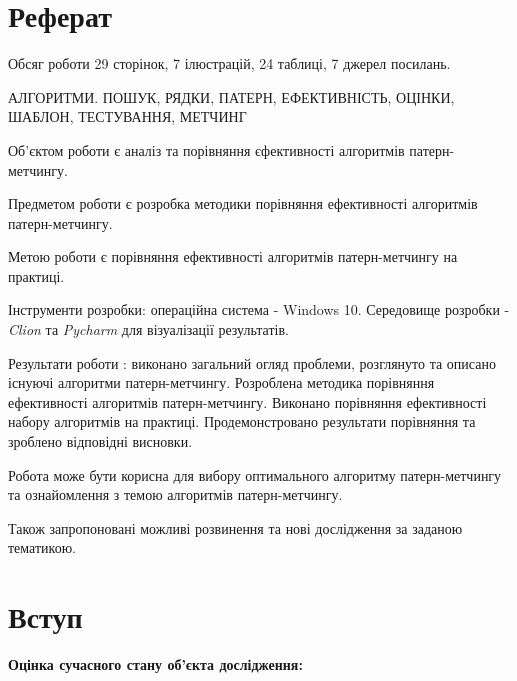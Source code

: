 \documentclass[a4paper,14pt]{extarticle} %
\begin{document}
	
	\newpage

	\section*{Реферат}

	Обсяг роботи 29 сторінок, 7 ілюстрацій, 24 таблиці, 7 джерел посилань.

	АЛГОРИТМИ. ПОШУК, РЯДКИ, ПАТЕРН,
	ЕФЕКТИВНІСТЬ, ОЦІНКИ, ШАБЛОН, ТЕСТУВАННЯ, МЕТЧИНГ

	Об'єктом роботи є аналіз та порівняння єфективності алгоритмів патерн-метчингу.
	
	Предметом роботи є розробка методики порівняння ефективності алгоритмів патерн-метчингу.

	Метою роботи є порівняння ефективності алгоритмів патерн-метчингу на практиці. 

	Інструменти розробки: операційна система - Windows 10. Середовище розробки - \textit{Clion} та \textit{Pycharm} для візуалізації результатів.

	Результати роботи : виконано загальний огляд проблеми, розглянуто та описано існуючі алгоритми патерн-метчингу.
	Розроблена методика порівняння ефективності алгоритмів патерн-метчингу. Виконано порівняння ефективності набору алгоритмів на практиці.
	Продемонстровано результати порівняння та зроблено відповідні висновки.

	Робота може бути корисна для вибору оптимального алгоритму патерн-метчингу та ознайомлення з темою алгоритмів патерн-метчингу.

	Також запропоновані можливі розвинення та нові дослідження за заданою тематикою.

	\newpage

    \tableofcontents


    \newpage
    
    \section*{Вступ}

	\textbf{Оцінка сучасного стану об’єкта дослідження:}
	
\end{document}
